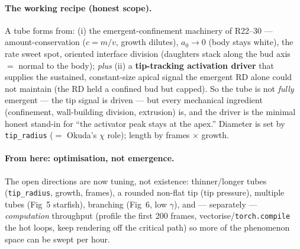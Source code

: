 \documentclass[11pt]{article}
\begin{document}
\paragraph{The working recipe (honest scope).} A tube forms from: (i) the emergent-confinement machinery of
R22--30 --- amount-conservation ($c=m/v$, growth dilutes), $a_0\!\to\!0$ (body stays white), the rate sweet
spot, oriented interface division (daughters stack along the bud axis $=$ normal to the body); \emph{plus}
(ii) a \textbf{tip-tracking activation driver} that supplies the sustained, constant-size apical signal the
emergent RD alone could not maintain (the RD held a confined bud but capped). So the tube is not \emph{fully}
emergent --- the tip signal is driven --- but every mechanical ingredient (confinement, wall-building
division, extrusion) is, and the driver is the minimal honest stand-in for ``the activator peak stays at the
apex.'' Diameter is set by \texttt{tip\_radius} ($=$ Okuda's $\chi$ role); length by frames $\times$ growth.

\paragraph{From here: optimisation, not emergence.} The open directions are now tuning, not existence:
thinner/longer tubes (\texttt{tip\_radius}, growth, frames), a rounded non-flat tip (tip pressure), multiple
tubes (Fig~5 starfish), branching (Fig~6, low $\gamma$), and --- separately --- \emph{computation} throughput
(profile the first 200 frames, vectorise/\texttt{torch.compile} the hot loops, keep rendering off the critical
path) so more of the phenomenon space can be swept per hour.
\end{document}
